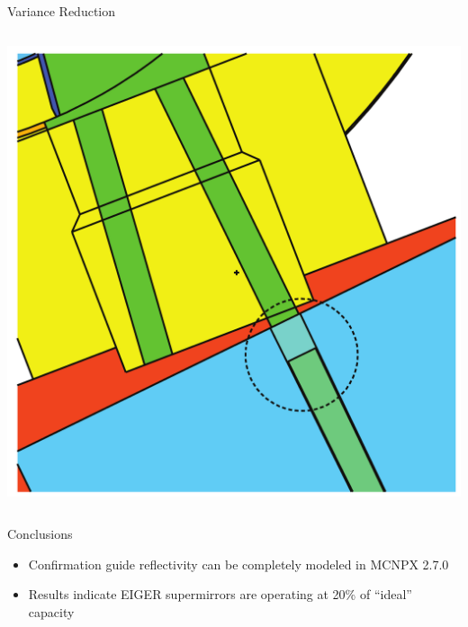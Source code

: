 \documentclass[final,t]{beamer}
\begin{document}
\begin{frame}{}
\begin{columns}[t]
\begin{column}{.3\linewidth}
\begin{block}{Variance Reduction}
\begin{columns}
\begin{column}{0.5\linewidth}
      \begin{center}
      \includegraphics*[width=.85\linewidth]{crystal.pdf}
      \end{center}
      
      \end{column}

      \end{columns}

      \end{block}


      \vspace{5ex}

      \begin{block}{\alert{Conclusions}}
        \begin{itemize}
        \item Confirmation guide reflectivity can be completely modeled in MCNPX 2.7.0
        \item Results indicate EIGER supermirrors are operating at 20\% of ``ideal'' capacity 
        \end{itemize}
        \vspace{-1ex}
      \end{block}


    \end{column}

    

\end{columns}
\end{frame}
\end{document}
